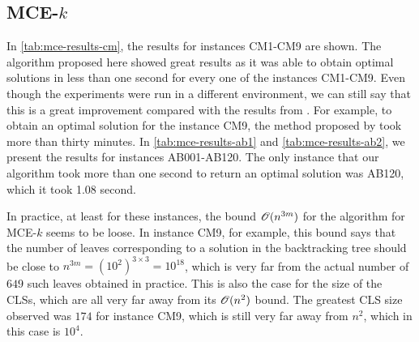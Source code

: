\subsection{MCE-$k$}

In \autoref{tab:mce-results-cm}, the results for instances CM1-CM9 are shown. 
The algorithm proposed here showed great results as it was able to obtain optimal solutions in less than one second for every one of the instances CM1-CM9.
Even though the experiments were run in a different environment, we can still say that this is a great improvement compared with the results from . For example, to obtain an optimal solution for the instance CM9, the method proposed by  took more than thirty minutes.
In \autoref{tab:mce-results-ab1} and \autoref{tab:mce-results-ab2}, we present the results for instances AB001-AB120. The only instance that our algorithm took more than one second to return an optimal solution was AB120, which it took 1.08 second.

In practice, at least for these instances, the bound $\mathscr{O}(n^{3m})$ for the algorithm for MCE-$k$ seems to be loose. In instance CM9, for example, this bound says that the number of leaves corresponding to a solution in the backtracking tree should be close to $n^{3m} = (10^2)^{3\times 3} = 10^{18}$, which is very far from the actual number of $649$ such leaves obtained in practice.
This is also the case for the size of the CLSs, which are all very far away from its $\mathscr{O}(n^2)$ bound. The greatest CLS size observed was $174$ for instance CM9, which is still very far away from $n^2$, which in this case is $10^4$.
\begin{table}
	\begin{center}
		\caption{Solutions of MCE-$k$ for instances CM1-CM9.}
		\label{tab:mce-results-cm}
	\end{center}
\end{table}

